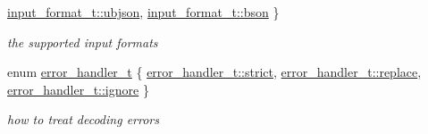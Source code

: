 \begin{DoxyCompactItemize}
\mbox{\hyperlink{namespacenlohmann_1_1detail_aa554fc6a11519e4f347deb25a9f0db40a4537f20910e85437f6d07701864084e8}{input\+\_\+format\+\_\+t\+::ubjson}}, 
\newline
\mbox{\hyperlink{namespacenlohmann_1_1detail_aa554fc6a11519e4f347deb25a9f0db40a0b6879b186bfb2b1ec65d2460e4eccd4}{input\+\_\+format\+\_\+t\+::bson}}
 \}
\begin{DoxyCompactList}\small\item\em the supported input formats \end{DoxyCompactList}\item 
enum \mbox{\hyperlink{namespacenlohmann_1_1detail_a5a76b60b26dc8c47256a996d18d967df}{error\+\_\+handler\+\_\+t}} \{ \mbox{\hyperlink{namespacenlohmann_1_1detail_a5a76b60b26dc8c47256a996d18d967dfa2133fd717402a7966ee88d06f9e0b792}{error\+\_\+handler\+\_\+t\+::strict}}, 
\mbox{\hyperlink{namespacenlohmann_1_1detail_a5a76b60b26dc8c47256a996d18d967dfa9dde360102c103867bd2f45872f1129c}{error\+\_\+handler\+\_\+t\+::replace}}, 
\mbox{\hyperlink{namespacenlohmann_1_1detail_a5a76b60b26dc8c47256a996d18d967dfa567bc1d268f135496de3d5b946b691f3}{error\+\_\+handler\+\_\+t\+::ignore}}
 \}
\begin{DoxyCompactList}\small\item\em how to treat decoding errors \end{DoxyCompactList}\end{DoxyCompactItemize}
